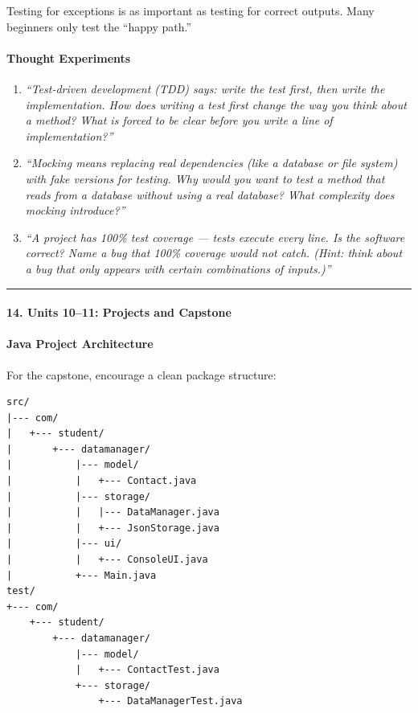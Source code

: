 \documentclass[
  justified,
  openright,
]{tufte-book}
\let\subsection\paragraph
\let\paragraph\paragraph
\let\subsection\paragraph
\let\paragraph\paragraph
\begin{document}
Testing for exceptions is as important as testing for correct outputs.
Many beginners only test the ``happy path.''

\paragraph{Thought Experiments}\label{thought-experiments-41}

\begin{enumerate}
\def\labelenumi{\arabic{enumi}.}
\item
  \emph{``Test-driven development (TDD) says: write the test first, then
  write the implementation. How does writing a test first change the way
  you think about a method? What is forced to be clear before you write
  a line of implementation?''}
\item
  \emph{``Mocking means replacing real dependencies (like a database or
  file system) with fake versions for testing. Why would you want to
  test a method that reads from a database without using a real
  database? What complexity does mocking introduce?''}
\item
  \emph{``A project has 100\% test coverage --- tests execute every
  line. Is the software correct? Name a bug that 100\% coverage would
  not catch. (Hint: think about a bug that only appears with certain
  combinations of inputs.)''}
\end{enumerate}

\begin{center}\rule{0.5\linewidth}{0.5pt}\end{center}

\subsection{14. Units 10--11: Projects and
Capstone}\label{units-1011-projects-and-capstone-1}

\subsection{Java Project
Architecture}\label{java-project-architecture}

For the capstone, encourage a clean package structure:

\begin{verbatim}
src/
|--- com/
|   +--- student/
|       +--- datamanager/
|           |--- model/
|           |   +--- Contact.java
|           |--- storage/
|           |   |--- DataManager.java
|           |   +--- JsonStorage.java
|           |--- ui/
|           |   +--- ConsoleUI.java
|           +--- Main.java
test/
+--- com/
    +--- student/
        +--- datamanager/
            |--- model/
            |   +--- ContactTest.java
            +--- storage/
                +--- DataManagerTest.java
\end{verbatim}
\end{document}
